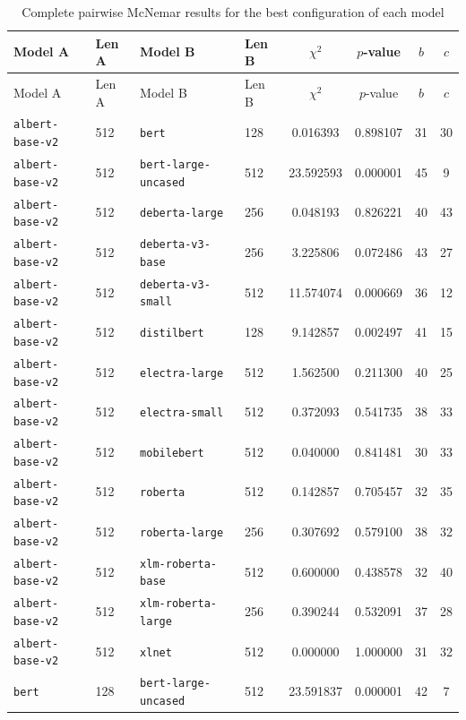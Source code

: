 \documentclass[11pt]{article}
\begin{document}
\begin{landscape}
\scriptsize
\begin{longtable}{llllcccc}
\caption{Complete pairwise McNemar results for the best configuration of each model} \\
\toprule
Model A & Len A & Model B & Len B & $\chi^2$ & $p$-value & $b$ & $c$ \\
\midrule
\endfirsthead
\toprule
Model A & Len A & Model B & Len B & $\chi^2$ & $p$-value & $b$ & $c$ \\
\midrule
\endhead

\texttt{albert-base-v2} & 512 & \texttt{bert} & 128 & 0.016393 & 0.898107 & 31 & 30 \\
\texttt{albert-base-v2} & 512 & \texttt{bert-large-uncased} & 512 & 23.592593 & 0.000001 & 45 & 9 \\
\texttt{albert-base-v2} & 512 & \texttt{deberta-large} & 256 & 0.048193 & 0.826221 & 40 & 43 \\
\texttt{albert-base-v2} & 512 & \texttt{deberta-v3-base} & 256 & 3.225806 & 0.072486 & 43 & 27 \\
\texttt{albert-base-v2} & 512 & \texttt{deberta-v3-small} & 512 & 11.574074 & 0.000669 & 36 & 12 \\
\texttt{albert-base-v2} & 512 & \texttt{distilbert} & 128 & 9.142857 & 0.002497 & 41 & 15 \\
\texttt{albert-base-v2} & 512 & \texttt{electra-large} & 512 & 1.562500 & 0.211300 & 40 & 25 \\
\texttt{albert-base-v2} & 512 & \texttt{electra-small} & 512 & 0.372093 & 0.541735 & 38 & 33 \\
\texttt{albert-base-v2} & 512 & \texttt{mobilebert} & 512 & 0.040000 & 0.841481 & 30 & 33 \\
\texttt{albert-base-v2} & 512 & \texttt{roberta} & 512 & 0.142857 & 0.705457 & 32 & 35 \\
\texttt{albert-base-v2} & 512 & \texttt{roberta-large} & 256 & 0.307692 & 0.579100 & 38 & 32 \\
\texttt{albert-base-v2} & 512 & \texttt{xlm-roberta-base} & 512 & 0.600000 & 0.438578 & 32 & 40 \\
\texttt{albert-base-v2} & 512 & \texttt{xlm-roberta-large} & 256 & 0.390244 & 0.532091 & 37 & 28 \\
\texttt{albert-base-v2} & 512 & \texttt{xlnet} & 512 & 0.000000 & 1.000000 & 31 & 32 \\
\texttt{bert} & 128 & \texttt{bert-large-uncased} & 512 & 23.591837 & 0.000001 & 42 & 7 \\

\end{longtable}
\end{landscape}
\end{document}
